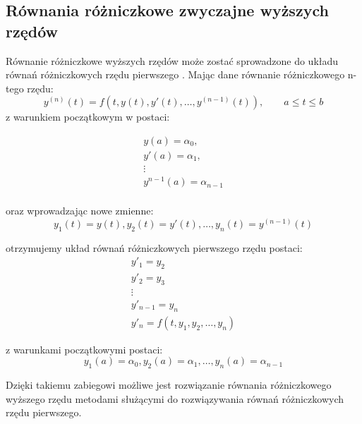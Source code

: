 \subsection*{Równania różniczkowe zwyczajne wyższych rzędów}
Równanie różniczkowe wyższych rzędów może zostać sprowadzone do układu równań różniczkowych rzędu pierwszego \cite[str. 293]{AK_RBG2002}. Mając dane równanie różniczkowego n-tego rzędu:
$$y^{(n)}(t) = f(t,y(t),y'(t),\hdots,y^{(n-1)}(t)), \qquad a \leq t \leq b$$
z warunkiem początkowym w postaci:

$$\begin{array}{c}
y(a)       = \alpha_0,    \\
y'(a)      = \alpha_1,    \\
\vdots					  \\
y^{n-1}(a) = \alpha_{n-1} \\
\end{array}$$

oraz wprowadzając nowe zmienne:
$$y_1(t) = y(t), y_2(t) = y'(t), \hdots, y_n(t) = y^{(n-1)}(t)$$

otrzymujemy układ równań różniczkowych pierwszego rzędu postaci:
$$\begin{array}{l}
y'_1       = y_2   \\
y'_2       = y_3   \\
\vdots			   \\
y'_{n-1} = y_n     \\
y'_n = f(t,y_1,y_2,\hdots,y_n)
\end{array}$$

z warunkami początkowymi postaci:
$$y_1(a) = \alpha_0, y_2(a) = \alpha_1, \hdots, y_n(a) = \alpha_{n-1}$$

Dzięki takiemu zabiegowi możliwe jest rozwiązanie równania różniczkowego wyższego rzędu metodami służącymi do rozwiązywania równań różniczkowych rzędu pierwszego.

\newpage
